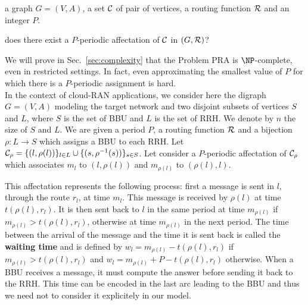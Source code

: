 \documentclass[a4paper,10pt]{article}
\begin{document}
       a graph $G=(V,A)$, a set $\cal C$ of pair of vertices, a routing function $\cal R$ and an integer $P$.

       does there exist a $P$-periodic affectation of $\cal C$ in $(G,{\cal R})$?

      We will prove in Sec.~\ref{sec:complexity} that the Problem PRA is $\NP$-complete, even in restricted settings.
      In fact, even approximating the smallest value of $P$ for which there is a $P$-periodic assignment is hard.\\
% 

      
      In the context of cloud-RAN applications, we consider here the digraph $G=(V,A)$ modeling the target network 
      and two disjoint subsets of vertices $S$ and $L$, where $S$ is the set of BBU and $L$ is the set of RRH. 
      We denote by $n$ the size of $S$ and $L$. We are given a period $P$, a routing function ${\cal R}$ and a bijection $\rho:L\rightarrow S$ which assigns a BBU to each RRH. Let ${\cal C}_{\rho} = \{(l,\rho(l))\}_{l \in L} \cup \{(s,\rho^{-1}(s))\}_{s \in S}$. Let consider a $P$-periodic affectation of ${\cal C}_{\rho}$ which associates $m_l$ to 
      $(l,\rho(l))$ and $m_{\rho(l)}$ to $(\rho(l),l)$.  
      
      This affectation represents the following process: first a message is sent in $l$, through the route $r_l$, at time $m_l$.
      This message is received by $\rho(l)$ at time $t(\rho(l),r_l)$. It is then sent back to $l$ in the same period at time $m_{\rho(l)}$ if $m_{\rho(l)} > t(\rho(l),r_l)$, otherwise at time $m_{\rho(l)}$ in the next period. The time between the arrival of the message and the time it is sent back is called the \textbf{waiting time} and is defined by $w_l = m_{\rho(l)} - t(\rho(l),r_l)$ if $m_{\rho(l)} > t(\rho(l),r_l)$ and $w_l = m_{\rho(l)} + P - t(\rho(l),r_l)$ otherwise.
      When a BBU receives a message, it must compute the answer before sending it back to the RRH. This time can be encoded
      in the last arc leading to the BBU and thus we need not to consider it explicitely in our model.
    
\end{document}
